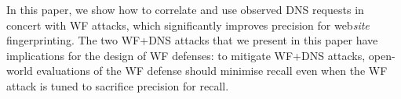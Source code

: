In this paper, we show how to correlate and use observed DNS requests in
concert with WF attacks,
which significantly
improves precision for web\emph{site} fingerprinting.
The two WF+DNS attacks  that we present in this paper have implications
for the design of WF defenses: 
to mitigate WF+DNS attacks, open-world evaluations of the WF defense should
minimise recall even when the WF attack is tuned to sacrifice precision for
recall.
